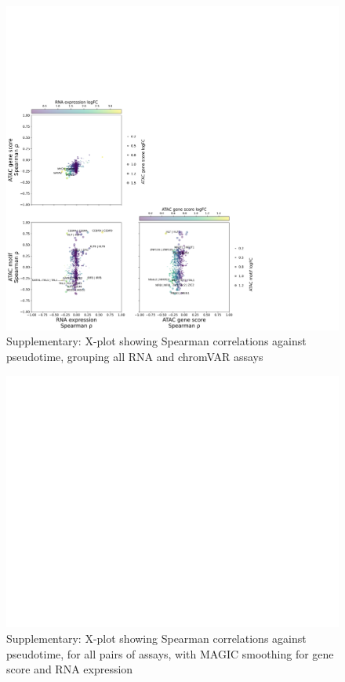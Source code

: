 \documentclass[a4paper]{article}
\begin{document}
\begin{figure}[!htb]
  \centering
  \includegraphics[width=\textwidth]{../figures/hematopoiesis/Monocyte_40_15_smooth_none_grouped_X_plot.png}
  \caption{Supplementary: X-plot showing Spearman correlations against pseudotime, grouping all RNA and chromVAR assays}
\end{figure}


\begin{figure}[!htb]
  \centering
  \includegraphics[width=\textwidth]{../figures/hematopoiesis/Monocyte_40_15_smooth_magic_detailed_X_plot.png}
  \caption{Supplementary: X-plot showing Spearman correlations against pseudotime, for all pairs of assays, with MAGIC smoothing for gene score and RNA expression}
\end{figure}
\end{document}
